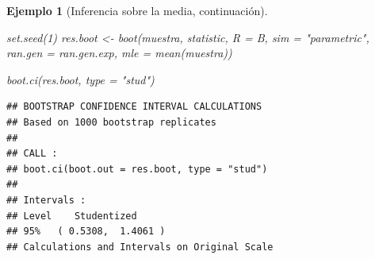 \documentclass[
]{book}
\newenvironment{Shaded}{\begin{snugshade}}{\end{snugshade}}
\newcommand{\AttributeTok}[1]{\textcolor[rgb]{0.77,0.63,0.00}{#1}}
\newcommand{\DecValTok}[1]{\textcolor[rgb]{0.00,0.00,0.81}{#1}}
\newcommand{\FunctionTok}[1]{\textcolor[rgb]{0.00,0.00,0.00}{#1}}
\newcommand{\NormalTok}[1]{#1}
\newcommand{\OtherTok}[1]{\textcolor[rgb]{0.56,0.35,0.01}{#1}}
\newcommand{\StringTok}[1]{\textcolor[rgb]{0.31,0.60,0.02}{#1}}
\theoremstyle{break}
\newtheorem{example}{Ejemplo}[chapter]
\theoremstyle{nonumberplain}
\begin{document}
\begin{example}[Inferencia sobre la media, continuación]
\begin{Shaded}
\begin{Highlighting}[]
\FunctionTok{set.seed}\NormalTok{(}\DecValTok{1}\NormalTok{)}
\NormalTok{res.boot }\OtherTok{\textless{}{-}} \FunctionTok{boot}\NormalTok{(muestra, statistic, }\AttributeTok{R =}\NormalTok{ B, }\AttributeTok{sim =} \StringTok{"parametric"}\NormalTok{,}
                 \AttributeTok{ran.gen =}\NormalTok{ ran.gen.exp, }\AttributeTok{mle =} \FunctionTok{mean}\NormalTok{(muestra))}

\FunctionTok{boot.ci}\NormalTok{(res.boot, }\AttributeTok{type =} \StringTok{"stud"}\NormalTok{)}
\end{Highlighting}
\end{Shaded}

\begin{verbatim}
## BOOTSTRAP CONFIDENCE INTERVAL CALCULATIONS
## Based on 1000 bootstrap replicates
## 
## CALL : 
## boot.ci(boot.out = res.boot, type = "stud")
## 
## Intervals : 
## Level    Studentized     
## 95%   ( 0.5308,  1.4061 )  
## Calculations and Intervals on Original Scale
\end{verbatim}

\end{example}
\end{document}
